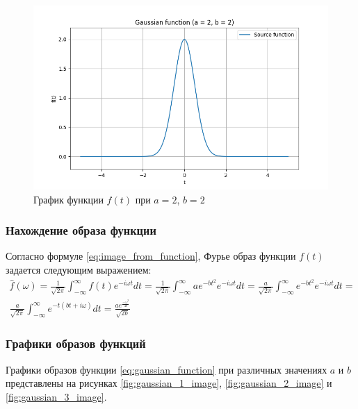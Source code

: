 \begin{figure}[ht!]
    \centering
    \includegraphics[width=\textwidth]{media/gaussian_3.png}
    \caption{График функции $f(t)$ при $a = 2$, $b = 2$}
    \label{fig:gaussian_3}
\end{figure}

\subsubsection{Нахождение образа функции}
Согласно формуле \eqref{eq:image_from_function}, Фурье образ функции $f(t)$ задается следующим выражением:
\begin{multline}
    \hat{f}(\omega) = \frac{1}{\sqrt{2\pi}} \int_{-\infty}^{\infty} f(t) e^{-i\omega t} dt = \frac{1}{\sqrt{2\pi}} \int_{-\infty}^{\infty} a e^{-bt^2} e^{-i\omega t} dt = \frac{a}{\sqrt{2\pi}} \int_{-\infty}^{\infty} e^{-bt^2} e^{-i\omega t} dt = \\
    \frac{a}{\sqrt{2\pi}} \int_{-\infty}^{\infty} e^{-t(bt +i\omega)} dt = \frac{ae^{\frac{-\omega^2}{4b}}}{\sqrt{2b}}
\end{multline}

\subsubsection{Графики образов функций}
Графики образов функции \eqref{eq:gaussian_function} при различных значениях $a$ и $b$ представлены на рисунках \ref{fig:gaussian_1_image}, \ref{fig:gaussian_2_image} и \ref{fig:gaussian_3_image}.


